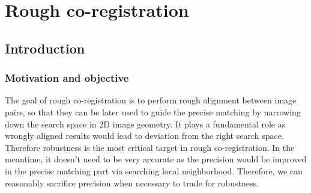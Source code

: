 
\chapter{Rough co-registration}
\label{chap:RoughCoReg}
\minitoc

\section{Introduction}
\subsection{Motivation and objective}
The goal of rough co-registration is to perform rough alignment between image pairs, so that they can be later used to guide the precise matching by narrowing down the search space in 2D image geometry. It plays a fundamental role as wrongly aligned results would lead to deviation from the right search space. Therefore robustness is the most critical target in rough co-registration. In the meantime, it doesn't need to be very accurate as the precision would be improved in the precise matching part via searching local neighborhood. Therefore, we can reasonably sacrifice precision when necessary to trade for robustness.\\

